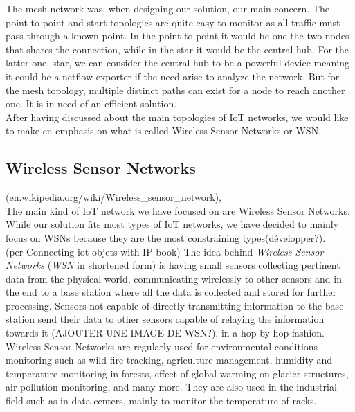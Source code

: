 The mesh network was, when designing our solution, our main concern. The point-to-point and start topologies are quite easy to monitor as all traffic must pass through a known point. In the point-to-point it would be one the two nodes that shares the connection, while in the star it would be the central hub. For the latter one, star, we can consider the central hub to be a powerful device meaning it could be a netflow exporter if the need arise to analyze the network. But for the mesh topology, multiple distinct paths can exist for a node to reach another one. It is in need of an efficient solution. \\

After having discussed about the main topologies of IoT networks, we would like to make en emphasis on what is called Wireless Sensor Networks or WSN.


\subsection*{Wireless Sensor Networks}

(en.wikipedia.org/wiki/Wireless\_sensor\_network),\\

The main kind of IoT network we have focused on are Wireless Sensor Networks. While our solution fits most types of IoT networks, we have decided to mainly focus on WSNs because they are the most constraining types(développer?).\\

(per Connecting iot objets with IP book)
The idea behind \textit{Wireless Sensor Networks} (\textit{WSN} in shortened form) is having small sensors collecting pertinent data from the physical world, communicating wirelessly to other sensors and in the end to a base station where all the data is collected and stored for further processing. Sensors not capable of directly transmitting information to the base station send their data to other sensors capable of relaying the information towards it (AJOUTER UNE IMAGE DE WSN?), in a hop by hop fashion.\\

Wireless Sensor Networks are regularly used for environmental conditions monitoring such as wild fire tracking, agriculture management, humidity and temperature monitoring in forests, effect of global warming on glacier structures, air pollution monitoring, and many more. They are also used in the industrial field such as in data centers, mainly to monitor the temperature of racks.  \\

